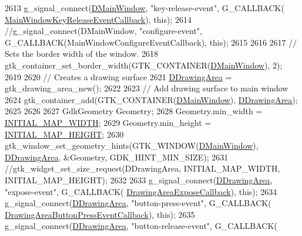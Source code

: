 \begin{DoxyCode}
2613     g\_signal\_connect(\hyperlink{classCApplicationData_af3c57a84b4ecca8a7f86b67a0ae55372}{DMainWindow}, \textcolor{stringliteral}{"key-release-event"}, G\_CALLBACK(
      \hyperlink{classCApplicationData_a4b2c76db5c2efd75404502e36700f99b}{MainWindowKeyReleaseEventCallback}), \textcolor{keyword}{this});
2614     \textcolor{comment}{//g\_signal\_connect(DMainWindow, "configure-event", G\_CALLBACK(MainWindowConfigureEventCallback), this);}
2615     
2616     
2617     \textcolor{comment}{// Sets the border width of the window. }
2618     gtk\_container\_set\_border\_width(GTK\_CONTAINER(\hyperlink{classCApplicationData_af3c57a84b4ecca8a7f86b67a0ae55372}{DMainWindow}), 2);
2619     
2620     \textcolor{comment}{// Creates a drawing surface}
2621     \hyperlink{classCApplicationData_a4735f5d31632313e0b2a1659eb178987}{DDrawingArea} = gtk\_drawing\_area\_new();
2622 
2623     \textcolor{comment}{// Add drawing surface to main window}
2624     gtk\_container\_add(GTK\_CONTAINER(\hyperlink{classCApplicationData_af3c57a84b4ecca8a7f86b67a0ae55372}{DMainWindow}), \hyperlink{classCApplicationData_a4735f5d31632313e0b2a1659eb178987}{DDrawingArea});
2625     
2626     
2627     GdkGeometry Geometry;
2628     Geometry.min\_width = \hyperlink{main_8cpp_ad7891427e5564fd0ea2a08a5857e4239}{INITIAL\_MAP\_WIDTH};
2629     Geometry.min\_height = \hyperlink{main_8cpp_ab9501bd883652bf538087bf32b51a10f}{INITIAL\_MAP\_HEIGHT};
2630     gtk\_window\_set\_geometry\_hints(GTK\_WINDOW(\hyperlink{classCApplicationData_af3c57a84b4ecca8a7f86b67a0ae55372}{DMainWindow}), 
      \hyperlink{classCApplicationData_a4735f5d31632313e0b2a1659eb178987}{DDrawingArea}, &Geometry, GDK\_HINT\_MIN\_SIZE);
2631     \textcolor{comment}{//gtk\_widget\_set\_size\_request(DDrawingArea, INITIAL\_MAP\_WIDTH, INITIAL\_MAP\_HEIGHT);}
2632     
2633     g\_signal\_connect(\hyperlink{classCApplicationData_a4735f5d31632313e0b2a1659eb178987}{DDrawingArea}, \textcolor{stringliteral}{"expose-event"}, G\_CALLBACK(
      \hyperlink{classCApplicationData_af2ec09e61420f6c493d7ef25e4a7bd11}{DrawingAreaExposeCallback}), \textcolor{keyword}{this});
2634     g\_signal\_connect(\hyperlink{classCApplicationData_a4735f5d31632313e0b2a1659eb178987}{DDrawingArea}, \textcolor{stringliteral}{"button-press-event"}, G\_CALLBACK(
      \hyperlink{classCApplicationData_aaa867e992733fa1e88e67c026c8a2947}{DrawingAreaButtonPressEventCallback}), \textcolor{keyword}{this});
2635     g\_signal\_connect(\hyperlink{classCApplicationData_a4735f5d31632313e0b2a1659eb178987}{DDrawingArea}, \textcolor{stringliteral}{"button-release-event"}, G\_CALLBACK(

\end{DoxyCode}
